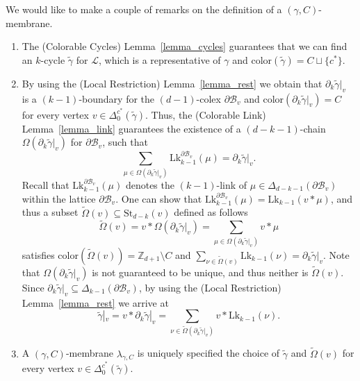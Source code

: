 \documentclass[onecolumn,letterpaper,11pt,accepted=2022-12-19]{quantumarticle}
\newcommand{\face}[2]{{\Delta_{#1}(#2)}}
\newcommand{\facex}[3]{{\Delta^{#1}_{#2}(#3)}}
\newcommand{\link}[2]{{\mathrm{Lk}_{#1}(#2)}}
\newcommand{\linkx}[3]{{\mathrm{Lk}^{#1}_{#2}(#3)}}
\renewcommand{\star}[2]{{\mathrm{St}_{#1}(#2)}}
\newcommand{\rest}[1]{|_{#1}}
\newcommand{\col}[1]{{\mathrm{color}(#1)}}
\theoremstyle{definition}
\theoremstyle{lemma}
\theoremstyle{theorem}
\theoremstyle{corollary}
\begin{document}
{We would like to make a couple of remarks on the definition of a $(\gamma,C)$-membrane.
\begin{enumerate}
\item[(i)] The (Colorable Cycles) Lemma~\ref{lemma_cycles} guarantees that we can find an $k$-cycle $\widetilde\gamma$ for $\mathcal{L}$, which is a representative of $\gamma$ and $\col{\widetilde\gamma} = C \sqcup \{c^*\}$.
\item[(ii)] By using the (Local Restriction) Lemma~\ref{lemma_rest} we obtain that $\partial_k\widetilde\gamma\rest v$ is a $(k-1)$-boundary for the $(d-1)$-colex $\partial\mathcal{B}_v$ and $\col{\partial_k\widetilde\gamma\rest v} = C$ for every vertex $v\in\facex{c^*} 0 {\widetilde\gamma}$.
Thus, the (Colorable Link) Lemma~\ref{lemma_link} guarantees the existence of a $(d-k-1)$-chain $\Omega(\partial_k\widetilde\gamma\rest v)$ for $\partial\mathcal{B}_v$, such that
\begin{equation}
\sum_{\mu\in\Omega(\partial_k\widetilde\gamma\rest v)} \linkx {\partial\mathcal{B}_v} {k-1} \mu = \partial_k\widetilde\gamma\rest v.
\end{equation}
Recall that $\linkx {\partial\mathcal{B}_v} {k-1} \mu$ denotes the $(k-1)$-link of $\mu\in\face {d-k-1}{\partial\mathcal{B}_v}$ within the lattice $\partial\mathcal{B}_v$.
{One can show that $\linkx {\partial\mathcal{B}_v} {k-1} \mu = \link {k-1} {v * \mu}$}, and thus a subset $\widetilde\Omega(v) \subseteq\star {d-k} v$ defined as follows
\begin{equation}
\widetilde\Omega(v) = v * \Omega(\partial_k\widetilde\gamma\rest v) = \sum_{\mu\in\Omega(\partial_k\widetilde\gamma\rest v)} v * \mu
\end{equation}
 satisfies $\col{\widetilde\Omega(v)} = \mathbb{Z}_{d+1}\setminus C$ and
$\sum_{\nu\in\widetilde\Omega(v)} \link {k-1} \nu = \partial_{k}\widetilde\gamma\rest v$.
Note that $\Omega(\partial_k\widetilde\gamma\rest v)$ is not guaranteed to be unique, and thus neither is $\widetilde\Omega(v)$.
Since $\partial_{k}\widetilde\gamma\rest v \subseteq \face {k-1}{\partial\mathcal{B}_v}$, by using the (Local Restriction) Lemma~\ref{lemma_rest} we arrive at
\begin{equation}
\label{eq_gammarest}
\widetilde\gamma\rest v =v * \partial_k\widetilde\gamma\rest v
= \sum_{\nu\in\widetilde\Omega(\partial_k\widetilde\gamma\rest v)} v * \link {k-1} \nu.
\end{equation}
\item[(iii)] A $(\gamma,C)$-membrane $\lambda_{\gamma,C}$ is uniquely specified the choice of $\widetilde\gamma$ and $\widetilde\Omega(v)$ for every vertex $v\in\facex {c^*} 0 {\widetilde\gamma}$.

\end{enumerate}}
\end{document}

